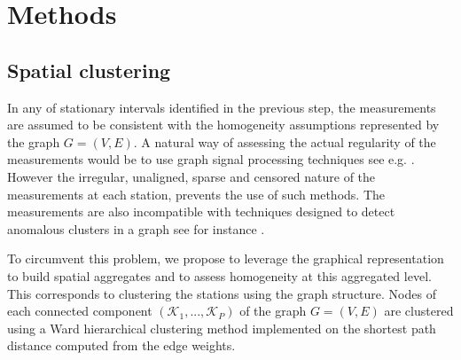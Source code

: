 \section{Methods}\label{section:methods}

\subsection{Spatial clustering}\label{section:spaceclust}

In any of stationary intervals identified in the previous step, the measurements are assumed to be consistent with the homogeneity assumptions represented by the graph $G=(V, E)$. A natural way of assessing the actual regularity of the measurements would be to use graph signal processing techniques see e.g. \cite{8347162, 6494675}. However the irregular, unaligned, sparse and censored nature of the measurements at each station, prevents the use of such methods. The measurements are also incompatible with techniques designed to detect anomalous clusters in a graph see for instance \cite{10.1214/10-AOS839}.

To circumvent this problem, we propose to leverage the graphical representation to build spatial aggregates and to assess homogeneity at this aggregated level. This corresponds to clustering the stations using the graph structure. Nodes of each connected component $(\mathcal{K}_1,...,\mathcal{K}_P)$ of the graph $G=(V, E)$ are clustered using a Ward hierarchical clustering method implemented on the shortest path distance computed from the edge weights. 

